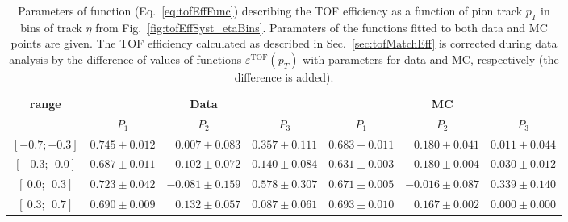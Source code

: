\begin{table}[t!]%
\centering%
\begin{tabular}{c||r|r|r||r|r|r}%
\multirow{2}{*}{\textbf{\bm{$\eta$} range}} &  \multicolumn{3}{c||}{\textbf{Data}} & \multicolumn{3}{c}{\textbf{MC}} \\ \cline{2-7}
  & \multicolumn{1}{c|}{$P_{1}$} & \multicolumn{1}{c|}{$P_{2}$} & \multicolumn{1}{c||}{$P_{3}$} & \multicolumn{1}{c|}{$P_{1}$} & \multicolumn{1}{c|}{$P_{2}$} & \multicolumn{1}{c}{$P_{3}$} \\ \Xhline{2\arrayrulewidth}
$[-0.7; -0.3]$   &\small   $ 0.745 \pm 0.012 $  &\small   $ 0.007 \pm 0.083 $  &\small   $ 0.357 \pm 0.111 $  &\small   $ 0.683 \pm 0.011 $  &\small   $ 0.180 \pm 0.041 $  &\small   $ 0.011 \pm 0.044 $\\
$[-0.3;~~0.0]$   &\small   $ 0.687 \pm 0.011 $  &\small   $ 0.102 \pm 0.072 $  &\small   $ 0.140 \pm 0.084 $  &\small   $ 0.631 \pm 0.003 $  &\small   $ 0.180 \pm 0.004 $  &\small   $ 0.030 \pm 0.012 $\\
$[~0.0;~~0.3]$   &\small   $ 0.723 \pm 0.042 $  &\small   $ -0.081 \pm 0.159 $  &\small   $ 0.578 \pm 0.307 $  &\small   $ 0.671 \pm 0.005 $  &\small   $ -0.016 \pm 0.087 $  &\small   $ 0.339 \pm 0.140 $\\
$[~0.3;~~0.7]$   &\small   $ 0.690 \pm 0.009 $  &\small   $ 0.132 \pm 0.057 $  &\small   $ 0.087 \pm 0.061 $  &\small   $ 0.693 \pm 0.010 $  &\small   $ 0.167 \pm 0.002 $  &\small   $ 0.000 \pm 0.000 $\\
\end{tabular}%
\caption[Parameters of function describing the TOF efficiency as a function of pion track $p_{T}$ in bins of track $\eta$.]{Parameters of function (Eq.~\eqref{eq:tofEffFunc}) describing the TOF efficiency as a function of pion track $p_{T}$ in bins of track $\eta$ from Fig.~\ref{fig:tofEffSyst_etaBins}. Paramaters of the functions fitted to both data and MC points are given. The TOF efficiency calculated as described in Sec.~\ref{sec:tofMatchEff} is corrected during data analysis by the difference of values of functions $\varepsilon^{\text{TOF}}(p_{T})$ with parameters for data and MC, respectively (the difference is added).}\label{tab:tofEffCorrParams}
\end{table}
